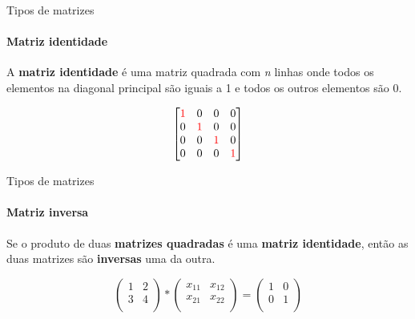 \begin{frame}[t]{Tipos de matrizes} 
    \framesubtitle{Matriz identidade}

    A \textbf{matriz identidade} é uma matriz quadrada com \textit{n} linhas onde todos os elementos na diagonal principal são iguais a 1 e todos os outros elementos são 0.
    \vspace*{0.5cm}

    \begin{equation}
            \begin{bmatrix}
            \textcolor{red}{1} & 0 & 0 & 0\\
            0 & \textcolor{red}{1} & 0 & 0\\
            0 & 0 & \textcolor{red}{1} & 0\\ 
            0 & 0 & 0 & \textcolor{red}{1}\\ 
         \end{bmatrix}
    \end{equation}
\end{frame}
\begin{frame}[t]{Tipos de matrizes} 
    \framesubtitle{Matriz inversa}

    Se o produto de duas \textbf{matrizes quadradas} é uma \textbf{matriz identidade}, então as duas matrizes são \textbf{inversas} uma da outra.


    \begin{equation}
        \begin{pmatrix}
            1 & 2 \\
            3 & 4 \\
        \end{pmatrix}
        *
        \begin{pmatrix}
            x_{11} & x_{12} \\
            x_{21} & x_{22} \\
        \end{pmatrix}
        =
        \begin{pmatrix}
            1 & 0 \\
            0 & 1 \\
        \end{pmatrix}
    \end{equation}
\end{frame}
